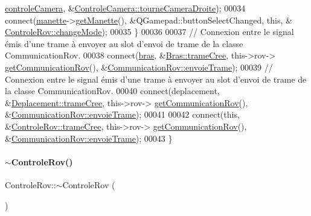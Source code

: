 \begin{DoxyCode}
      \hyperlink{class_controle_rov_ac88fe7f2367cca5a24aeda187ee0bac2}{controleCamera}, &\hyperlink{class_controle_camera_aac294c4e98a912199ba32d686e52f7ef}{ControleCamera::tourneCameraDroite});
00034         connect(\hyperlink{class_controle_rov_af5caffd78d06f90d045b53ee87ad76df}{manette}->\hyperlink{class_manette_a708eccb66e967e0fe575b19e9899ff5a}{getManette}(), &QGamepad::buttonSelectChanged, \textcolor{keyword}{this}, &
      \hyperlink{class_controle_rov_a206d52adf49b8510316b2885ea6b98b0}{ControleRov::changeMode});
00035     \}
00036 
00037     \textcolor{comment}{// Connexion entre le signal émis d'une trame à envoyer au slot d'envoi de trame de la classe
       CommunicationRov.}
00038     connect(\hyperlink{class_controle_rov_a1b2e394dd6332b2acd1be0770451e140}{bras}, &\hyperlink{class_bras_ab442bf8d3e389c051b26b4b0741e7924}{Bras::trameCree}, this->rov->
      \hyperlink{class_rov_ad30543625f584e28bf785a80c59506dc}{getCommunicationRov}(), &\hyperlink{class_communication_rov_ac243fcfb073f4ceaf58fab1d41207801}{CommunicationRov::envoieTrame});
00039     \textcolor{comment}{// Connexion entre le signal émis d'une trame à envoyer au slot d'envoi de trame de la classe
       CommunicationRov.}
00040     connect(deplacement, &\hyperlink{class_deplacement_ae1a6d4a98304dee19d426ceeb6b7d5bb}{Deplacement::trameCree}, this->rov->
      \hyperlink{class_rov_ad30543625f584e28bf785a80c59506dc}{getCommunicationRov}(), &\hyperlink{class_communication_rov_ac243fcfb073f4ceaf58fab1d41207801}{CommunicationRov::envoieTrame});
00041 
00042     connect(\textcolor{keyword}{this}, &\hyperlink{class_controle_rov_a05506e1d8caf632b0394dcffd365c06f}{ControleRov::trameCree}, this->rov->
      \hyperlink{class_rov_ad30543625f584e28bf785a80c59506dc}{getCommunicationRov}(), &\hyperlink{class_communication_rov_ac243fcfb073f4ceaf58fab1d41207801}{CommunicationRov::envoieTrame});
00043 \}
\end{DoxyCode}
\mbox{\label{class_controle_rov_ab216ab83b9dfb738aa240c3846e65d39}} 
\paragraph{\texorpdfstring{$\sim$\+Controle\+Rov()}{~ControleRov()}}
{\footnotesize\ttfamily Controle\+Rov\+::$\sim$\+Controle\+Rov (\begin{DoxyParamCaption}{ }\end{DoxyParamCaption})}


